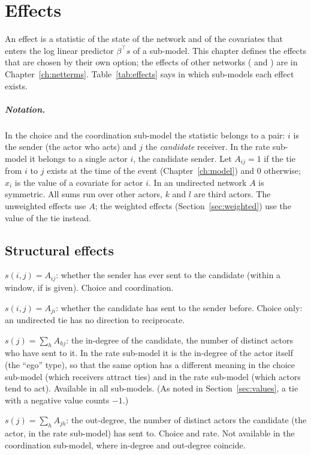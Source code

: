 \chapter{Effects}\label{ch:effects}

An effect is a statistic of the state of the network and of the covariates that enters the log linear predictor $\beta^{\top}s$ of a sub-model. This chapter defines the effects that are chosen by their own option; the effects of other networks ( and ) are in Chapter~\ref{ch:netterms}. Table~\ref{tab:effects} says in which sub-models each effect exists.

\paragraph{Notation.} In the choice and the coordination sub-model the statistic belongs to a pair: $i$ is the sender (the actor who acts) and $j$ the \emph{candidate} receiver. In the rate sub-model it belongs to a single actor $i$, the candidate sender. Let $A_{ij}=1$ if the tie from $i$ to $j$ exists at the time of the event (Chapter~\ref{ch:model}) and $0$ otherwise; $x_i$ is the value of a covariate for actor $i$. In an undirected network $A$ is symmetric. All sums run over other actors, $k$ and $l$ are third actors. The unweighted effects use $A$; the weighted effects (Section~\ref{sec:weighted}) use the value of the tie instead.

\section{Structural effects}

\begin{description}[style=nextline,nosep]
  \item[\opt{inertia}] $s(i,j)=A_{ij}$: whether the sender has ever sent to the candidate (within a window, if  is given). Choice and coordination.
  \item[\opt{recip}] $s(i,j)=A_{ji}$: whether the candidate has sent to the sender before. Choice only: an undirected tie has no direction to reciprocate.
  \item[\opt{indeg}] $s(j)=\sum_h A_{hj}$: the in-degree of the candidate, the number of distinct actors who have sent to it. In the rate sub-model it is the in-degree of the actor itself (the ``ego'' type), so that the same option has a different meaning in the choice sub-model (which receivers attract ties) and in the rate sub-model (which actors tend to act). Available in all sub-models. (As noted in Section~\ref{sec:values}, a tie with a negative value counts $-1$.)
  \item[\opt{outdeg}] $s(j)=\sum_h A_{jh}$: the out-degree, the number of distinct actors the candidate (the actor, in the rate sub-model) has sent to. Choice and rate. Not available in the coordination sub-model, where in-degree and out-degree coincide.
\end{description}

